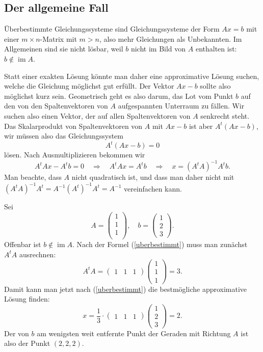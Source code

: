 %
%
\subsection{Der allgemeine Fall}
Überbestimmte Gleichungssysteme sind Gleichungssysteme der Form
$Ax=b$ mit einer $m\times n$-Matrix mit $m>n$, also mehr Gleichungen
als Unbekannten.
Im Allgemeinen sind sie nicht lösbar, weil $b$ nicht
im Bild von $A$ enthalten ist: $b\not\in \operatorname{im}A$.

Statt einer exakten Lösung könnte man daher eine approximative
Lösung suchen, welche die Gleichung möglichst gut erfüllt.
Der Vektor $Ax-b$ sollte also möglichst kurz sein.
Geometrisch
geht es also darum, das Lot vom Punkt $b$ auf den von den Spaltenvektoren
von $A$ aufgespannten Unterraum zu fällen.
Wir suchen also
einen Vektor, der auf allen Spaltenvektoren von $A$ senkrecht steht.
Das Skalarprodukt von Spaltenvektoren von $A$ mit $Ax-b$ ist aber
$A^t(Ax-b)$, wir müssen also das Gleichungssystem
\[A^t(Ax-b)=0\]
lösen.
Nach Ausmultiplizieren bekommen wir
\begin{equation}
A^tAx-A^tb=0\quad\Rightarrow\quad A^tAx=A^tb\quad\Rightarrow\quad
x=(A^tA)^{-1}A^tb.
\label{uberbestimmt}
\end{equation}
Man beachte, dass $A$ nicht quadratisch ist, und dass man daher
nicht mit $(A^tA)^{-1}A^t=A^{-1}(A^t)^{-1}A^t=A^{-1}$ vereinfachen
kann.

\begin{beispiel}
Sei 
\[
A=\begin{pmatrix}1\\1\\1\\\end{pmatrix},\quad b=\begin{pmatrix}1\\2\\3\end{pmatrix}.
\]
Offenbar ist $b\not\in\operatorname{im}A$.
Nach der Formel (\ref{uberbestimmt}) muss man zunächst $A^tA$ ausrechnen:
\[
A^tA=\begin{pmatrix}1&1&1\end{pmatrix}\begin{pmatrix}1\\1\\1\end{pmatrix}=3.
\]
Damit kann man jetzt nach (\ref{uberbestimmt}) die bestmögliche
approximative Lösung finden:
\[
x=\frac13\cdot\begin{pmatrix}1&1&1\end{pmatrix}
\begin{pmatrix}1\\2\\3\end{pmatrix}=2.
\]
Der von $b$ am wenigsten weit entfernte Punkt der Geraden mit
Richtung $A$ ist also der Punkt $(2,2,2)$.
\end{beispiel}

